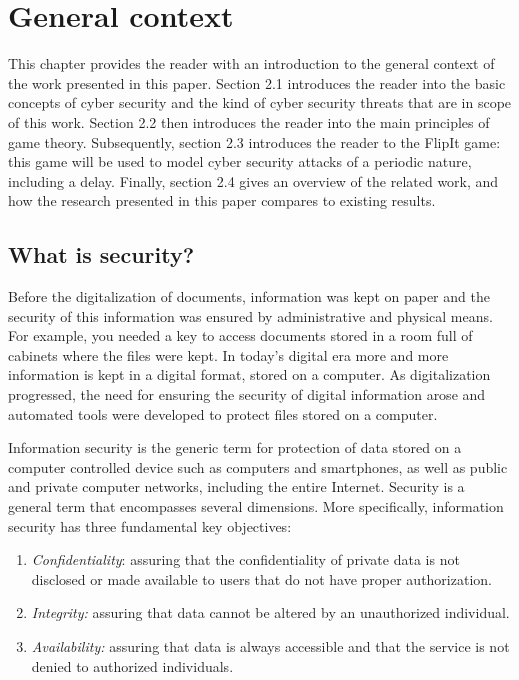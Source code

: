 \chapter{General context}
\label{Chapter1:Intro.Game.Theory}
%


This chapter provides the reader with an introduction to the general context of the work presented in this paper.  Section 2.1 introduces the reader into the basic concepts of cyber security and the kind of cyber security threats that are in scope of this work. Section 2.2 then introduces the reader into the main principles of game theory. Subsequently, section 2.3 introduces the reader to the FlipIt game: this game will be used to model cyber security attacks of a periodic nature, including a delay.  Finally, section 2.4 gives an overview of the related work, and how the research presented in this paper compares to existing results.
\section{What is security?}

Before the digitalization of documents, information was kept on paper and the security of this information was ensured by administrative and physical means. For example, you needed a key to access documents stored in a room full of cabinets where the files were kept. In today's digital era more and more information is kept in a digital format, stored on a computer.  As digitalization progressed, the need for ensuring the security of digital information arose and automated tools were developed to protect files stored on a computer.  

Information security is the generic term for protection of data stored on a computer controlled device such as computers and smartphones, as well as public and private computer networks, including the entire Internet. 
Security is a general term that encompasses several dimensions. More specifically, information security has three fundamental key objectives:

\begin{enumerate}
\item  \textit{Confidentiality}: assuring that the confidentiality of private data is not disclosed or made available to users that do not have proper authorization.
\item \textit{Integrity:} assuring that data cannot be altered by an unauthorized individual.
\item \textit{Availability:} assuring that data is always accessible and that the service is not denied to authorized individuals.
\end{enumerate}



